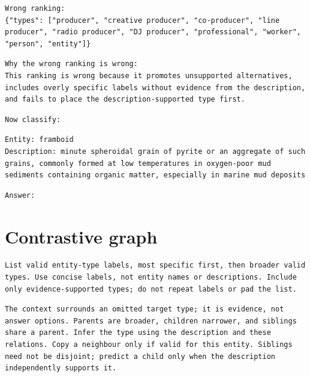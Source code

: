 \begin{Verbatim}[fontsize=\footnotesize,breaklines=true,breakanywhere=true]
Wrong ranking:
{"types": ["producer", "creative producer", "co-producer", "line producer", "radio producer", "DJ producer", "professional", "worker", "person", "entity"]}
\end{Verbatim}

\begin{Verbatim}[fontsize=\footnotesize,breaklines=true,breakanywhere=true]
Why the wrong ranking is wrong:
This ranking is wrong because it promotes unsupported alternatives, includes overly specific labels without evidence from the description, and fails to place the description-supported type first.
\end{Verbatim}

\begin{Verbatim}[fontsize=\footnotesize,breaklines=true,breakanywhere=true]
Now classify:
\end{Verbatim}

\begin{Verbatim}[fontsize=\footnotesize,breaklines=true,breakanywhere=true]
Entity: framboid
Description: minute spheroidal grain of pyrite or an aggregate of such grains, commonly formed at low temperatures in oxygen-poor mud sediments containing organic matter, especially in marine mud deposits
\end{Verbatim}

\begin{Verbatim}[fontsize=\footnotesize,breaklines=true,breakanywhere=true]
Answer:
\end{Verbatim}

\clearpage

\section{Contrastive graph}

\begin{Verbatim}[fontsize=\footnotesize,breaklines=true,breakanywhere=true]
List valid entity-type labels, most specific first, then broader valid types. Use concise labels, not entity names or descriptions. Include only evidence-supported types; do not repeat labels or pad the list.
\end{Verbatim}

\begin{Verbatim}[fontsize=\footnotesize,breaklines=true,breakanywhere=true]
The context surrounds an omitted target type; it is evidence, not answer options. Parents are broader, children narrower, and siblings share a parent. Infer the type using the description and these relations. Copy a neighbour only if valid for this entity. Siblings need not be disjoint; predict a child only when the description independently supports it.
\end{Verbatim}

